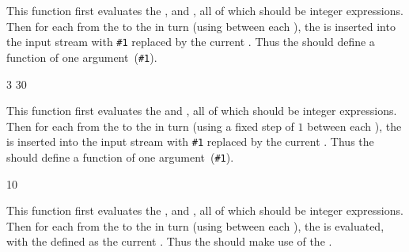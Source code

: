 \documentclass[oneside]{book}
\begin{document}
\begin{function}{\intStepInline}
\begin{syntax}
    
\end{syntax}
This function first evaluates the , 
and , all of which should be integer expressions.
Then for each  from the  to the
 in turn (using  between each
), the  is inserted into the input stream
with \verb|#1| replaced by the current . Thus the
 should define a function of one argument~(\verb|#1|).
\begin{demohigh}
\IgnoreSpacesOn
\tlClear \lTmpaTl
{} {3} {30} {
  \tlPutRight \lTmpaTl {[#1]}
}
\tlUse \lTmpaTl
\IgnoreSpacesOff
\end{demohigh}
\end{function}

\begin{function}{\intStepOneInline}
\begin{syntax}
   
\end{syntax}
This function first evaluates the  and ,
all of which should be integer expressions.
Then for each  from the  to the
 in turn (using a fixed step of $1$ between each
), the  is inserted into the input stream
with \verb|#1| replaced by the current . Thus the
 should define a function of one argument~(\verb|#1|).
\begin{demohigh}
\IgnoreSpacesOn
\tlClear \lTmpaTl
{} {10} {
  \tlPutRight \lTmpaTl {[#1]}
}
\tlUse \lTmpaTl
\IgnoreSpacesOff
\end{demohigh}
\end{function}

\begin{function}{\intStepVariable}
\begin{syntax}
     
\end{syntax}
This function first evaluates the , 
and , all of which should be integer expressions.
Then for each  from the  to the
 in turn (using  between each
), the  is evaluated,
with the  defined as the current . Thus
the  should make use of the .
\end{function}
\end{document}
